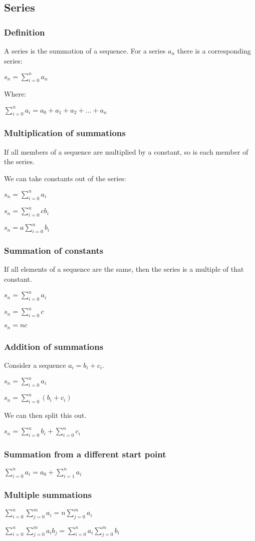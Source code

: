 
\subsection{Series}

\subsubsection{Definition}

A series is the summation of a sequence. For a series \(a_n\) there is a corresponding series:

$s_n=\sum_{i=0}^na_n$

Where:

$\sum_{i=0}^na_i=a_0+a_1+a_2+...+a_n$

\subsubsection{Multiplication of summations}

If all members of a sequence are multiplied by a constant, so is each member of the series.

We can take constants out of the series:

$s_n=\sum_{i=0}^na_i$

$s_n=\sum_{i=0}^ncb_i$

$s_n=a\sum_{i=0}^nb_i$

\subsubsection{Summation of constants}

If all elements of a sequence are the same, then the series is a multiple of that constant.

$s_n=\sum_{i=0}^na_i$

$s_n=\sum_{i=0}^nc$

$s_n=nc$

\subsubsection{Addition of summations}

Consider a sequence \(a_i=b_i+c_i\).

$s_n=\sum_{i=0}^na_i$

$s_n=\sum_{i=0}^n(b_i+c_i)$

We can then split this out.

$s_n=\sum_{i=0}^nb_i+\sum_{i=0}^nc_i$

\subsubsection{Summation from a different start point}

$\sum_{i=0}^na_i=a_0+\sum_{i=1}^na_i$

\subsubsection{Multiple summations}

$\sum^n_{i=0} \sum^m_{j=0} a_i=n\sum^m_{j=0} a_i$

$\sum^n_{i=0} \sum^m_{j=0} a_i b_j=\sum^n_{i=0}a_i\sum^m_{j=0}b_i$


